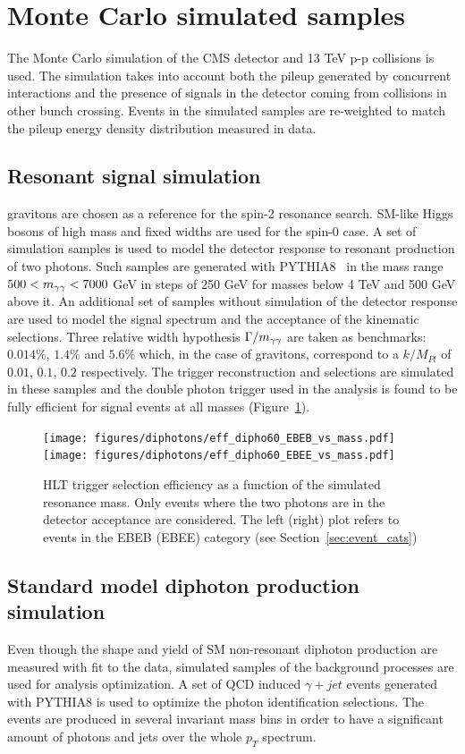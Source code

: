 \clearpage
\section{Monte Carlo simulated samples}
The Monte Carlo simulation of the CMS detector and 13 TeV p-p collisions is used. The simulation
takes into account both the pileup generated by concurrent interactions and the presence of
signals in the detector coming from collisions in other bunch crossing. Events in the simulated samples
are re-weighted to match the pileup energy density distribution measured in data.

\subsection{Resonant signal simulation}
\RS gravitons are chosen as a reference for the spin-2 resonance search. SM-like Higgs bosons of high mass and
fixed widths are used for the spin-0 case.
A set of simulation samples is used to model the detector response to resonant production of two photons.
Such samples are generated with PYTHIA8~\cite{pythia8} in the mass range $500 < m_{\gamma\gamma} < 7000$ GeV in steps of 250 GeV for
masses below 4 TeV and 500 GeV above it. An additional set of samples without simulation of the detector
response are used to model the signal spectrum and the acceptance of the kinematic selections.
Three relative width hypothesis $\Gamma/m_{\gamma\gamma}$ are taken as benchmarks: $0.014\%$, $1.4\%$ and $5.6\%$ which,
in the case of \RS gravitons, correspond to a $k/M_{Pl}$ of $0.01$, $0.1$, $0.2$ respectively.
The trigger reconstruction and selections are simulated in these samples and the double photon trigger
used in the analysis is found to be fully efficient for signal events at all masses (Figure~\ref{fig:trig_eff_sig}).

\begin{figure}[h!]
  \centering
  \texttt{[image: figures/diphotons/eff\_dipho60\_EBEB\_vs\_mass.pdf]}
  \texttt{[image: figures/diphotons/eff\_dipho60\_EBEE\_vs\_mass.pdf]}
  \caption{HLT trigger selection efficiency as a function of the simulated resonance mass. Only events where the two photons are
    in the detector acceptance are considered. The left (right) plot refers to events in the EBEB (EBEE)
    category (see Section~\ref{sec:event_cats})}
  \label{fig:trig_eff_sig}
\end{figure}

\subsection{Standard model diphoton production simulation}
Even though the shape and yield of SM non-resonant diphoton production are measured with fit to the data,
simulated samples of the background processes are used for analysis optimization. A set of QCD induced
$\gamma+jet$ events generated with PYTHIA8 is used to optimize the photon identification selections.
The events are produced in several invariant mass bins in order to have a significant amount of photons and
jets over the whole $p_T$ spectrum.

